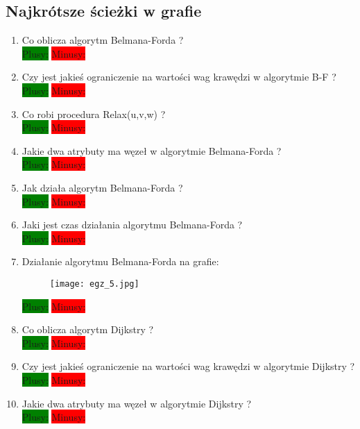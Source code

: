 \documentclass[a4paper,11pt]{article}
\begin{document}
\subsection{Najkrótsze ścieżki w grafie}
\begin{enumerate}
\item Co oblicza algorytm Belmana-Forda ? \\
\colorbox{green}{Plusy:} \colorbox{red}{Minusy: }

\item Czy jest jakieś ograniczenie na wartości wag krawędzi w algorytmie B-F ? \\
\colorbox{green}{Plusy:} \colorbox{red}{Minusy: }

\item Co robi procedura Relax(u,v,w) ? \\
\colorbox{green}{Plusy:} \colorbox{red}{Minusy: }

\item Jakie dwa atrybuty ma węzeł w algorytmie Belmana-Forda ? \\
\colorbox{green}{Plusy:} \colorbox{red}{Minusy: }

\item Jak działa algorytm Belmana-Forda ? \\
\colorbox{green}{Plusy:} \colorbox{red}{Minusy: }

\item Jaki jest czas działania algorytmu Belmana-Forda ? \\
\colorbox{green}{Plusy:} \colorbox{red}{Minusy: }

\item Działanie algorytmu Belmana-Forda na grafie: 
\begin{figure}[H]
\texttt{[image: egz\_5.jpg]}
\end{figure}
\colorbox{green}{Plusy:} \colorbox{red}{Minusy: } 

\item Co oblicza algorytm Dijkstry ? \\
\colorbox{green}{Plusy:} \colorbox{red}{Minusy: }

\item Czy jest jakieś ograniczenie na wartości wag krawędzi w algorytmie Dijkstry ? \\
\colorbox{green}{Plusy:} \colorbox{red}{Minusy: }

\item Jakie dwa atrybuty ma węzeł w algorytmie Dijkstry ? \\
\colorbox{green}{Plusy:} \colorbox{red}{Minusy: }


\end{enumerate}
\end{document}
